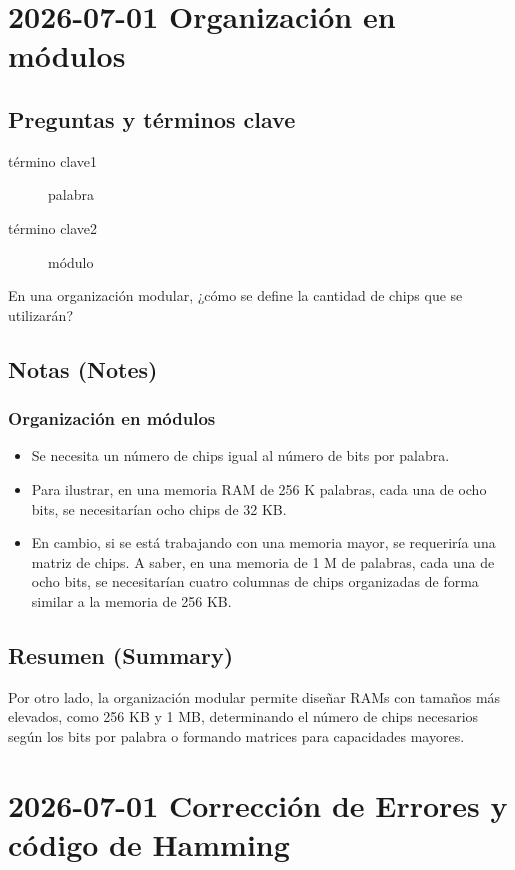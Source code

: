 \documentclass{article}
\begin{document}
\section{2026-07-01 Organización en módulos}
\label{sec:org793db31}

\subsection{Preguntas y términos clave}
\label{sec:orgc0e953c}
\begin{description}
\item[{término clave1}] palabra
\item[{término clave2}] módulo
\item[{En una organización modular, ¿cómo se define la cantidad de chips que se utilizarán?}] 
\end{description}

\subsection{Notas (Notes)}
\label{sec:orgdbef35e}
\subsubsection{Organización en módulos}
\label{sec:org54b76df}
\begin{itemize}
\item Se necesita un número de chips igual al número de bits por palabra.
\item Para ilustrar, en una memoria RAM de 256 K palabras, cada una de
ocho bits, se necesitarían ocho chips de 32 KB.
\item En cambio, si se está trabajando con una memoria mayor, se
requeriría una matriz de chips. A saber, en una memoria de 1 M de
palabras, cada una de ocho bits, se necesitarían cuatro columnas de
chips organizadas de forma similar a la memoria de 256 KB.
\end{itemize}

\subsection{Resumen (Summary)}
\label{sec:org8dadfca}
Por otro lado, la organización modular permite diseñar RAMs con tamaños
más elevados, como 256 KB y 1 MB, determinando el número de chips 
necesarios según los bits por palabra o formando matrices para
capacidades mayores.

\section{2026-07-01 Corrección de Errores y código de Hamming}
\label{sec:orgc886dfb}
\end{document}
